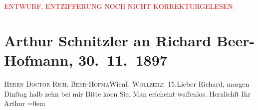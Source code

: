 
\begin{center}
            \textcolor{red}{ENTWURF. ENTZIFFERUNG NOCH NICHT KORREKTURGELESEN}
                      \end{center}
            
               \section[Arthur Schnitzler an Richard Beer-Hofmann, 30. 11. 1897]{ Arthur Schnitzler an Richard Beer-Hofmann, 30. 11. 1897}\nopagebreak{}\rehead{ }\begin{ledgroupsized}[t]{13cm}\normalsize\beginnumbering{} \toendnotes[C]{\smallbreak\pagebreak[2]} 
\pstart{}{\pb}\textsc{Herrn Doctor
                     Rich. Beer-Hofma{\geminationn}}\pend{}\pstart{}Wien\pend{}\pstart{}\textsc{I.
                     Wollzeile 15}.\pend{}{\bigskip}\pstart{}{\pb}Lieber Richard, \pend\pstart
           morgen Dinſtag{ }halb zehn bei mir\pend
           \pstart
           Bitte ko{\geminationm}en Sie.\pend
           \pstart
           Man erſcheint waffenlos.\pend
           \pstart
           Herzlichſt Ihr{\\[\baselineskip]}\spacefill\mbox{Arthur}\pend
           \leftskip=0em{}\endnumbering{}\end{ledgroupsized}  \newcommand{\dateiname}{L00745}\newcommand{\titel}{Arthur Schnitzler an Richard Beer-Hofmann, 30. 11. 1897}\newcommand{\editorInnen}{Martin Anton Müller und Gerd-Hermann Susen}
      